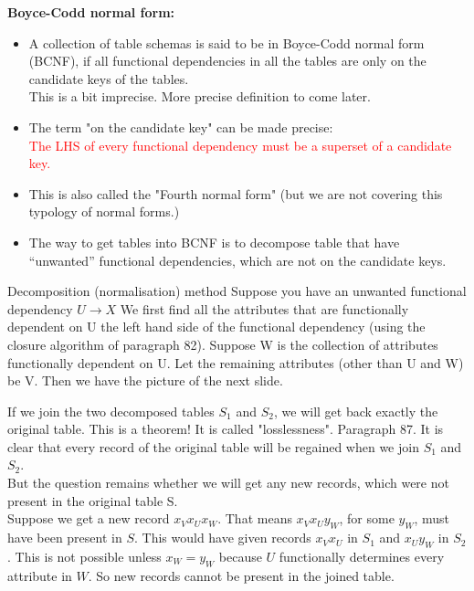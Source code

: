\textbf{Boyce-Codd normal form:}
\begin{itemize}
  \item A collection of table schemas is said to be in Boyce-Codd normal form (BCNF), if all functional dependencies in all the tables are only on the candidate keys of the tables.\\
This is a bit imprecise. More precise definition to come later.
  \item The term "on the candidate key" can be made precise: \\
  \textcolor{red}{The LHS of every functional dependency must be a superset of a candidate key.}
  \item This is also called the "Fourth normal form" (but we are not covering this typology of normal forms.)
  \item The way to get tables into BCNF is to decompose table that have “unwanted” functional dependencies, which are not on the candidate keys.
\end{itemize}

Decomposition (normalisation) method
Suppose you have an unwanted functional dependency $U \rightarrow X$
We first find all the attributes that are functionally dependent on U the left hand side of the functional dependency
(using the closure algorithm of paragraph 82).
Suppose W is the collection of attributes functionally dependent on U.
Let the remaining attributes (other than U and W) be V.
Then we have the picture of the next slide.

If we join the two decomposed tables $S_1$ and $S_2$, we will get back exactly the original table.
This is a theorem! It is called "losslessness". Paragraph 87.
It is clear that every record of the original table will be regained when we join $S_1$ and $S_2$. \\
But the question remains whether we will get any new records, which were not present in the original table S.\\
Suppose we get a new record $x_V x_U x_W$. That means $x_V x_U y_W$, for some $y_W$, must have been present in $S$.
This would have given records $x_V x_U$ in $S_1$ and $x_U y_W$ in $S_2$.
This is not possible unless $x_W=y_W$ because $U$ functionally determines every attribute in $W$.
So new records cannot be present in the joined table.


